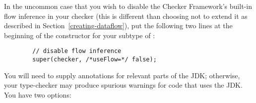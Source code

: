 
In the uncommon case that you wish to disable the Checker Framework's
built-in flow inference in your checker (this is different than choosing
not to extend it as described in Section~\ref{creating-dataflow}), put the
following two lines at the beginning of the constructor for your subtype of
:

\begin{Verbatim}
        // disable flow inference
        super(checker, /*useFlow=*/ false);
\end{Verbatim}



You will need to supply annotations for relevant parts of the JDK;
otherwise, your type-checker may produce spurious warnings for code that
uses the JDK\@.  You have two options:

